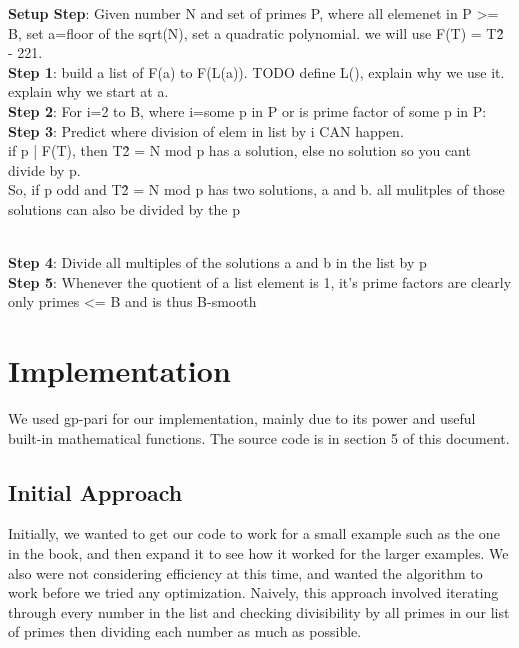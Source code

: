 \documentclass[titlepage]{article}
\begin{document}
		\noindent\textbf{Setup Step}: Given number N and set of primes P, where all elemenet in P >= B, set a=floor of the sqrt(N), set a quadratic polynomial. we will use F(T) = T\^2 - 221.\\

		\noindent\textbf{Step 1}: build a list of F(a) to F(L(a)). TODO define L(), explain why we use it. explain why we start at a.\\

		\noindent\textbf{Step 2}: For i=2 to B, where i=some p in P or is prime factor of some p in P:\\
	
		\noindent\textbf{Step 3}: Predict where division of elem in list by i CAN happen.\\
		if p | F(T), then T\^2 = N mod p has a solution, else no solution so you cant divide by p.\\
		So, if p odd  and T\^2 = N mod p has two solutions, a and b. all mulitples of those solutions can also be divided by the p\\\

		\noindent\textbf{Step 4}: Divide all multiples of the solutions a and b in the list by p\\

		\noindent\textbf{Step 5}: Whenever the quotient of a list element is 1,  it's prime factors are clearly only primes <= B and is thus B-smooth\\ 
	  
	\section{Implementation}
	We used gp-pari for our implementation, mainly due to its power and useful built-in mathematical functions. The source code is in section 5 of this document.
	
		\subsection{Initial Approach}
		Initially, we wanted to get our code to work for a small example such as the one in the book, and then expand it to see how it worked for the larger examples. We also were not considering efficiency at this time, and wanted the algorithm to work before we tried any optimization. Naively, this approach involved iterating through every number in the list and checking divisibility by all primes in our list of primes then dividing each number as much as possible.
		
\end{document}
